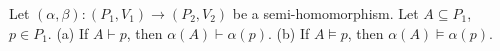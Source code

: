 Let $(\alpha, \beta): (P_1, V_1) \to (P_2, V_2)$ be a semi-homomorphism. Let $A \subseteq P_1$, $p \in P_1$.
(a) If $A \vdash p$, then $\alpha(A) \vdash \alpha(p)$.
(b) If $A \models p$, then $\alpha(A) \models \alpha(p)$.
